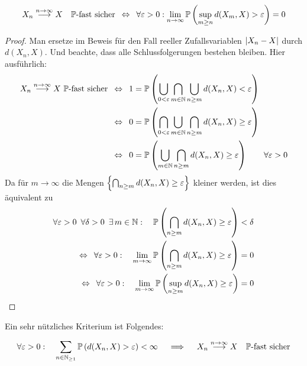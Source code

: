 \begin{satz}\label{satz: 3.9}
	\begin{equation*}
		X_n \overset{n \to \infty}{\longrightarrow} X \quad \mathbb{P}\text{-fast sicher}
		\enskip \Leftrightarrow \enskip
		\forall\varepsilon > 0: \lim_{n \to \infty} \mathbb{P}\left( \sup_{m\ge n} d(X_m,X) > \varepsilon \right) = 0
	\end{equation*}
\end{satz}
\begin{proof}
	Man ersetze im Beweis für den Fall reeller Zufallsvariablen $\left| X_n-X \right|$ durch $d(X_n,X)$.
	Und beachte, dass alle Schlussfolgerungen bestehen bleiben. Hier ausführlich:
	\begin{align*}
		X_n \overset{n\to \infty}{\longrightarrow} X~\mathbb{P} \text{-fast sicher}
		&\enskip \Leftrightarrow \enskip 1 = \mathbb{P}\left( \bigcup_{0 < \varepsilon} \bigcap_{m  \in  \mathbb{N}} \bigcup_{n \ge m} d(X_n, X) < \varepsilon \right) \\
		&\enskip \Leftrightarrow \enskip 0 = \mathbb{P}\left( \bigcap_{0 < \varepsilon} \bigcup_{m  \in  \mathbb{N}} \bigcap_{n \ge m} d(X_n, X) \ge \varepsilon \right) \\
		&\enskip \Leftrightarrow \enskip 0 = \mathbb{P}\left( \bigcup_{m  \in  \mathbb{N}} \bigcap_{n \ge m} d(X_n, X) \ge \varepsilon \right) \qquad \forall \varepsilon > 0
	\end{align*}
	Da für $m \to  \infty$ die Mengen $\left\{ \bigcap_{n \ge m} d(X_n, X) \ge \varepsilon \right\}$ kleiner werden,
	ist dies äquivalent zu
	\begin{align*}
		\forall \varepsilon > 0 \enskip \forall \delta > 0 \enskip \exists\, m  \in \mathbb{N}: \quad \mathbb{P}\left( \bigcap_{n \ge m} d(X_n, X) \ge \varepsilon \right) &< \delta \\
		\enskip \Leftrightarrow \enskip \forall \varepsilon > 0: \quad \lim_{m \to  \infty} \mathbb{P}\left( \bigcap_{n \ge m} d(X_n, X) \ge \varepsilon \right) &= 0 \\
		\enskip \Leftrightarrow \enskip \forall \varepsilon > 0: \quad \lim_{m \to  \infty} \mathbb{P}\left( \sup_{n \ge m} d(X_n, X) \ge \varepsilon \right) &= 0
	\end{align*}
\end{proof}

Ein sehr nützliches Kriterium ist Folgendes:
\begin{satz}\label{satz: 3.10}
	\begin{align*}
		\forall \varepsilon > 0: \quad 
		\sum_{n \in \mathbb{N}_{\ge1}}\mathbb{P}\left( d(X_n,X)>\varepsilon \right) < \infty
		\quad \implies \quad  X_n \overset{n \to \infty}{\longrightarrow} X \quad \mathbb{P}\text{-fast sicher}
	\end{align*}
\end{satz}

